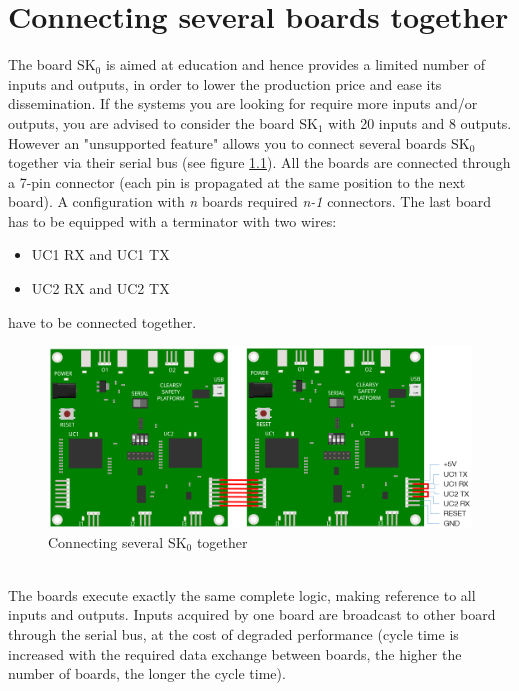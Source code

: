 \chapter{Connecting several boards together}

The board SK$_0$ is aimed at education and hence provides a limited number of inputs and outputs, in order to lower the production price and ease its dissemination. If the systems you are looking for require more inputs and/or outputs, you are advised to consider the board SK$_1$ with 20 inputs and 8 outputs. \\
However an "unsupported feature" allows you to connect several boards SK$_0$ together via their serial bus (see figure \ref{annexes:SK0-HW-serial-bus}). All the boards are connected through a 7-pin connector (each pin is propagated at the same position to the next board). A configuration with \textit{n} boards required  \textit{n-1} connectors. The last board has to be equipped with a terminator with two wires: 
\begin{itemize}
    \item UC1 RX and UC1 TX
    \item UC2 RX and UC2 TX 
\end{itemize}
have to be connected together.
\begin{figure}[h]
\centering\includegraphics[scale=0.30]{Pictures/chapterAnnexes/SK0-connectinb-boards.png}
\caption{Connecting several SK$_0$ together}
\label{annexes:SK0-HW-serial-bus}
\end{figure} \\
The boards execute exactly the same complete logic, making reference to all inputs and outputs. Inputs acquired by one board are broadcast to other board through the serial bus, at the cost of degraded performance (cycle time is increased with the required data exchange between boards, the higher the number of boards, the longer the cycle time).\\

